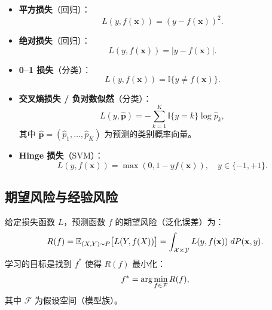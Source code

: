 \begin{definition}[常见损失函数]
\begin{itemize}
    \item \textbf{平方损失}（回归）：
    \begin{equation}
        L(y, f(\mathbf{x})) = (y - f(\mathbf{x}))^2.
    \end{equation}
    \item \textbf{绝对损失}（回归）：
    \begin{equation}
        L(y, f(\mathbf{x})) = |y - f(\mathbf{x})|.
    \end{equation}
    \item \textbf{0--1 损失}（分类）：
    \begin{equation}
        L(y, f(\mathbf{x})) = \mathbb{I}\{y \neq f(\mathbf{x})\}.
    \end{equation}
    \item \textbf{交叉熵损失 / 负对数似然}（分类）：
    \begin{equation}
        L(y, \hat{\mathbf{p}}) = -\sum_{k=1}^{K} \mathbb{I}\{y = k\} \log \hat{p}_k,
    \end{equation}
    其中 $\hat{\mathbf{p}} = (\hat{p}_1, \dots, \hat{p}_K)$ 为预测的类别概率向量。
    \item \textbf{Hinge 损失}（SVM）：
    \begin{equation}
        L(y, f(\mathbf{x})) = \max(0, 1 - y f(\mathbf{x})),\quad y \in \{-1, +1\}.
    \end{equation}
\end{itemize}
\end{definition}

\subsection{期望风险与经验风险}

\begin{definition}
给定损失函数 $L$，预测函数 $f$ 的期望风险（泛化误差）为：
\begin{equation}\label{eq:expected_risk}
    R(f) = \mathbb{E}_{(X,Y) \sim P}\big[L(Y, f(X))\big]
         = \int_{\mathcal{X} \times \mathcal{Y}} L(y, f(\mathbf{x})) \; dP(\mathbf{x}, y).
\end{equation}
学习的目标是找到 $f^*$ 使得 $R(f)$ 最小化：
\begin{equation}
    f^* = \arg\min_{f \in \mathcal{F}} R(f),
\end{equation}
其中 $\mathcal{F}$ 为假设空间（模型族）。
\end{definition}

